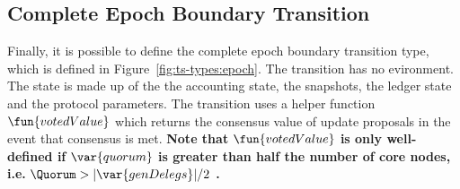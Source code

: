 \clearpage

\subsection{Complete Epoch Boundary Transition}
\label{sec:total-epoch}

Finally, it is possible to define the complete epoch boundary transition type,
which is defined in Figure~\ref{fig:ts-types:epoch}.
The transition has no evironment.
The state is made up of the the accounting state, the snapshots, the ledger state and the
protocol parameters.
The transition uses a helper function $\fun{votedValue}$ which returns
the consensus value of update proposals in the event that consensus is met.
\textbf{Note that} $\fun{votedValue}$
\textbf{is only well-defined if } $\var{quorum}$
\textbf{is greater than half the number of core nodes, i.e.}
$\Quorum > |\var{genDelegs}|/2$ \textbf{.}

